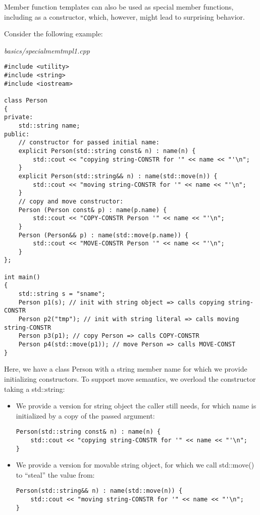 Member function templates can also be used as special member functions, including as a constructor, which, however, might lead to surprising behavior.

Consider the following example:

\noindent
\textit{basics/specialmemtmpl1.cpp}
\begin{lstlisting}[style=styleCXX]
#include <utility>
#include <string>
#include <iostream>

class Person
{
private:
	std::string name;
public:
	// constructor for passed initial name:
	explicit Person(std::string const& n) : name(n) {
		std::cout << "copying string-CONSTR for '" << name << "'\n";
	}
	explicit Person(std::string&& n) : name(std::move(n)) {
		std::cout << "moving string-CONSTR for '" << name << "'\n";
	}
	// copy and move constructor:
	Person (Person const& p) : name(p.name) {
		std::cout << "COPY-CONSTR Person '" << name << "'\n";
	}
	Person (Person&& p) : name(std::move(p.name)) {
		std::cout << "MOVE-CONSTR Person '" << name << "'\n";
	}
};

int main()
{
	std::string s = "sname";
	Person p1(s); // init with string object => calls copying string-CONSTR
	Person p2("tmp"); // init with string literal => calls moving string-CONSTR
	Person p3(p1); // copy Person => calls COPY-CONSTR
	Person p4(std::move(p1)); // move Person => calls MOVE-CONST
}
\end{lstlisting}

Here, we have a class Person with a string member name for which we provide initializing constructors. To support move semantics, we overload the constructor taking a std::string:

\begin{itemize}
\item 
We provide a version for string object the caller still needs, for which name is initialized by a copy of the passed argument:

\begin{lstlisting}[style=styleCXX]
Person(std::string const& n) : name(n) {
	std::cout << "copying string-CONSTR for '" << name << "'\n";
}
\end{lstlisting}

\item 
We provide a version for movable string object, for which we call std::move() to “steal” the value from:

\begin{lstlisting}[style=styleCXX]
Person(std::string&& n) : name(std::move(n)) {
	std::cout << "moving string-CONSTR for '" << name << "'\n";
}
\end{lstlisting}
\end{itemize}

